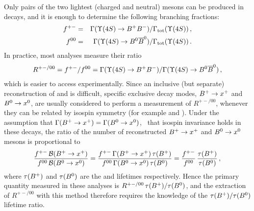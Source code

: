 Only pairs of the two lightest (charged and neutral) \B mesons 
can be produced in \Ups decays, 
and it is enough to determine the following branching 
fractions:
\begin{eqnarray}
f^{+-} & = & \Gamma(\Ups \to \particle{B^+B^-})/
             \Gamma_{\rm tot}(\Ups)  \,, \\
f^{00} & = & \Gamma(\Ups \to \particle{B^0\bar{B}^0})/
             \Gamma_{\rm tot}(\Ups) \,.
\end{eqnarray}
In practice, most analyses measure their ratio
\begin{equation}
R^{+-/00} = f^{+-}/f^{00} = \Gamma(\Ups \to \particle{B^+B^-})/
             \Gamma(\Ups \to \particle{B^0\bar{B}^0}) \,,
\end{equation}
which is easier to access experimentally.
Since an inclusive (but separate) reconstruction of 
\Bu and \Bd is difficult, specific exclusive decay modes, 
${B^+} \to x^+$ and ${B^0} \to x^0$, are usually considered to perform 
a measurement of $R^{+-/00}$, whenever they can be related by 
isospin symmetry (for example  and 
).
Under the assumption that $\Gamma(B^+ \to x^+) = \Gamma(B^0 \to x^0)$, 
\ie\ that isospin invariance holds in these \B decays,
the ratio of the number of reconstructed
$B^+ \to x^+$ and $B^0 \to x^0$ mesons is proportional to
\begin{equation}
\frac{f^{+-}\, \BR{\Bu\to x^+}}{f^{00}\, \BR{\Bd\to x^0}}
= \frac{f^{+-}\, \Gamma({\Bu}\to x^+)\, \tau(\Bu)}%
{f^{00}\, \Gamma({\Bd}\to x^0)\,\tau(\Bd)}
= \frac{f^{+-}}{f^{00}} \, \frac{\tau(\Bu)}{\tau(\Bd)}  \,, 
\end{equation} 
where $\tau(B^+)$ and $\tau(B^0)$ are the \Bu and \Bd 
lifetimes respectively.
Hence the primary quantity measured in these analyses 
is $R^{+-/00} \, \tau(B^+)/\tau(B^0)$, 
and the extraction of $R^{+-/00}$ with this method therefore 
requires the knowledge of the $\tau(B^+)/\tau(B^0)$ lifetime ratio. 

